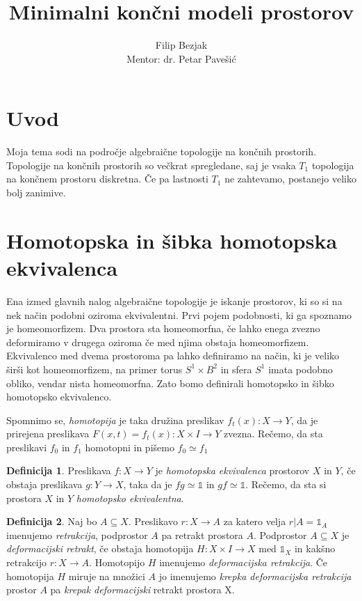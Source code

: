 \documentclass[a4paper,12pt]{article}
\title{Minimalni končni modeli prostorov}
\author{Filip Bezjak \\ Mentor: dr. Petar Pavešić}
\theoremstyle{definition}
\newtheorem{definicija}{Definicija}
\theoremstyle{plain}
\theoremstyle{definition}
\theoremstyle{plain}
\theoremstyle{plain}
\theoremstyle{plain}
\theoremstyle{plain}
\begin{document}
\maketitle

\section{Uvod}
Moja tema sodi na področje algebraične topologije na končnih prostorih. Topologije na končnih prostorih so večkrat spregledane, saj je vsaka $T_1$ topologija
na končnem prostoru diskretna. Če pa lastnosti $T_1$ ne zahtevamo, postanejo veliko bolj
zanimive.

\section{Homotopska in šibka homotopska ekvivalenca}

Ena izmed glavnih nalog algebraične topologije je iskanje prostorov, ki so si 
na nek način podobni oziroma ekvivalentni. Prvi pojem podobnosti, ki ga spoznamo
je homeomorfizem. Dva prostora sta homeomorfna, če lahko enega zvezno deformiramo
v drugega oziroma če med njima obstaja homeomorfizem. Ekvivalenco med dvema 
prostoroma pa lahko definiramo na način, ki je veliko širši kot homeomorfizem, 
na primer torus $S^1\times B^2$ in sfera $S^1$ imata podobno obliko, vendar nista
 homeomorfna. Zato bomo definirali homotopsko in šibko homotopsko ekvivalenco.

Spomnimo se, \textit{homotopija} je taka družina preslikav $f_t(x):X \rightarrow Y$, da je prirejena preslikava $F(x,t)=f_t(x):X \times I \rightarrow Y$ zvezna. Rečemo, da sta preslikavi $f_0$ in $f_1$ homotopni in pišemo $f_0 \simeq f_1$


\begin{definicija}
    Preslikava  $f : X \rightarrow Y$ je \textit{homotopska ekvivalenca} prostorov $X$ in $Y$, če obstaja preslikava $g: Y\rightarrow X$, taka da
    je $f g \simeq \mathds{1}$ in $gf \simeq \mathds{1}$. Rečemo, da sta si prostora $X$ in
    $Y$  \textit{homotopsko ekvivalentna}.
\end{definicija}

\begin{definicija}
    Naj bo $A \subseteq X$. Preslikavo $r : X \rightarrow A$ za katero 
    velja $r|A = \mathds{1}_A$ imenujemo \textit{retrakcija}, podprostor
     $A$ pa retrakt prostora $A$. Podprostor $A \subseteq X$ je 
     \textit{deformacijski retrakt}, če obstaja homotopija $H : X \times
      I \rightarrow X$ med $\mathds{1}_X$ in kakšno retrakcijo $r : X 
      \rightarrow A$. Homotopijo $H$ imenujemo \textit{deformacijska 
      retrakcija}. Če homotopija $H$ miruje na množici $A$ jo imenujemo 
      \textit{krepka deformacijska retrakcija} prostor $A$ pa 
      \textit{krepak deformacijski} retrakt prostora X.
\end{definicija}
\end{document}
